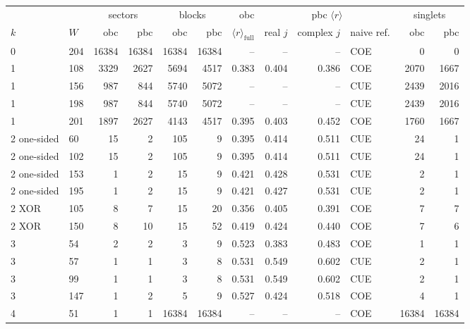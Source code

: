 \begin{tabular}{llrrrrrrrlrr}
\toprule
 & & \multicolumn{2}{c}{sectors} & \multicolumn{2}{c}{blocks} & obc & \multicolumn{3}{c}{pbc $\langle r\rangle$} & \multicolumn{2}{c}{singlets} \\
$k$ & $W$ & obc & pbc & obc & pbc & $\langle r\rangle_\mathrm{full}$ & real $j$ & complex $j$ & naive ref. & obc & pbc \\
\midrule
0 & 204 & 16384 & 16384 & 16384 & 16384 & -- & -- & -- & COE & 0 & 0 \\
1 & 108 & 3329 & 2627 & 5694 & 4517 & 0.383 & 0.404 & 0.386 & COE & 2070 & 1667 \\
1 & 156 & 987 & 844 & 5740 & 5072 & -- & -- & -- & CUE & 2439 & 2016 \\
1 & 198 & 987 & 844 & 5740 & 5072 & -- & -- & -- & CUE & 2439 & 2016 \\
1 & 201 & 1897 & 2627 & 4143 & 4517 & 0.395 & 0.403 & 0.452 & COE & 1760 & 1667 \\
2 one-sided & 60 & 15 & 2 & 105 & 9 & 0.395 & 0.414 & 0.511 & CUE & 24 & 1 \\
2 one-sided & 102 & 15 & 2 & 105 & 9 & 0.395 & 0.414 & 0.511 & CUE & 24 & 1 \\
2 one-sided & 153 & 1 & 2 & 15 & 9 & 0.421 & 0.428 & 0.531 & CUE & 2 & 1 \\
2 one-sided & 195 & 1 & 2 & 15 & 9 & 0.421 & 0.427 & 0.531 & CUE & 2 & 1 \\
2 XOR & 105 & 8 & 7 & 15 & 20 & 0.356 & 0.405 & 0.391 & COE & 7 & 7 \\
2 XOR & 150 & 8 & 10 & 15 & 52 & 0.419 & 0.424 & 0.440 & COE & 7 & 6 \\
3 & 54 & 2 & 2 & 3 & 9 & 0.523 & 0.383 & 0.483 & COE & 1 & 1 \\
3 & 57 & 1 & 1 & 3 & 8 & 0.531 & 0.549 & 0.602 & CUE & 2 & 1 \\
3 & 99 & 1 & 1 & 3 & 8 & 0.531 & 0.549 & 0.602 & CUE & 2 & 1 \\
3 & 147 & 1 & 2 & 5 & 9 & 0.527 & 0.424 & 0.518 & COE & 4 & 1 \\
4 & 51 & 1 & 1 & 16384 & 16384 & -- & -- & -- & COE & 16384 & 16384 \\
\bottomrule
\end{tabular}
